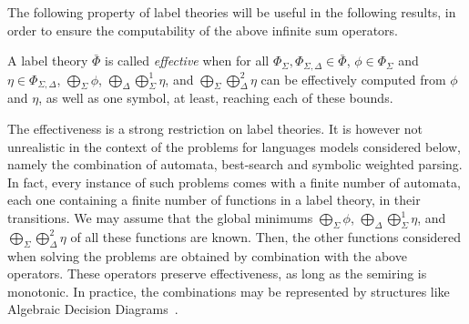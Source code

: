 



\noindent 
The following property of label theories will be useful in 
the following results, in order to ensure 
the computability of the above infinite sum operators.
%
\begin{definition}\label{def:effective}
A label theory $\bar\Phi$ is called \emph{effective} when
for all $\Phi_{\Sigma}, \Phi_{\Sigma, \Delta} \in \bar\Phi$, 
$\phi \in \Phi_\Sigma$ and $\eta \in \Phi_{\Sigma, \Delta}$,
$\bigoplus_{\Sigma} \phi$,
$\bigoplus_{\Delta}\bigoplus^1_{\Sigma} \eta$, and
$\bigoplus_{\Sigma}\bigoplus^2_{\Delta} \eta$
can be effectively computed from $\phi$ and $\eta$,
as well as one symbol, at least, 
reaching each of these bounds.
\end{definition}

The effectiveness is a strong restriction on label theories.
It is however not unrealistic in the context of the problems for languages models considered below, 
namely the combination of automata, best-search and symbolic weighted parsing.
%
In fact, every instance of such problems comes with a finite number of automata, each one containing a finite number of functions in a label theory, in their transitions. 
We may assume that the global minimums $\bigoplus_{\Sigma} \phi$,
$\bigoplus_{\Delta}\bigoplus^1_{\Sigma} \eta$, and
$\bigoplus_{\Sigma}\bigoplus^2_{\Delta} \eta$
of all these functions are known.
%
Then, the other functions considered when solving the problems are obtained by combination with the above operators.  
These operators preserve effectiveness, as long as the semiring is monotonic. 
In practice, the combinations may be represented by structures like 
Algebraic Decision Diagrams~\cite{Bahar97ADD}.




